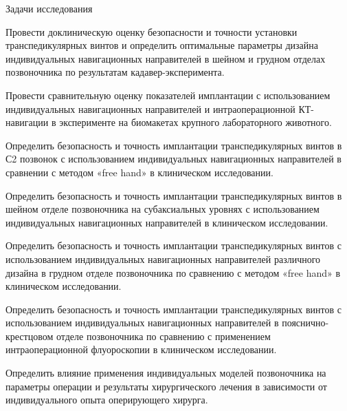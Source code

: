 
Задачи исследования

\item Провести доклиническую оценку безопасности и точности установки
			транспедикулярных винтов и определить оптимальные параметры дизайна
			индивидуальных навигационных направителей в шейном и грудном отделах
			позвоночника по результатам кадавер-эксперимента.

\item Провести   сравнительную    оценку   показателей
			имплантации   с
			использованием индивидуальных навигационных направителей и
			интраоперационной КТ-навигации в эксперименте на биомакетах крупного
			лабораторного
			животного.

\item Определить безопасность и точность имплантации
			транспедикулярных винтов в С2 позвонок с использованием индивидуальных
			навигационных
			направителей в сравнении с методом «free hand» в клиническом
			исследовании.

\item Определить безопасность и точность имплантации
			транспедикулярных винтов в шейном отделе позвоночника на
			субаксиальных уровнях с
			использованием индивидуальных навигационных направителей
			в клиническом
			исследовании.

\item Определить безопасность и точность
			имплантации транспедикулярных винтов с использованием индивидуальных
			навигационных направителей различного дизайна в грудном отделе
			позвоночника по сравнению с
			методом «free hand» в клиническом исследовании.

\item Определить безопасность и точность
			имплантации транспедикулярных винтов с использованием
			индивидуальных навигационных направителей
			в пояснично-крестцовом отделе позвоночника
			по сравнению с применением
			интраоперационной флуороскопии в клиническом
			исследовании.

\item Определить влияние применения
			индивидуальных моделей позвоночника на параметры операции и
			результаты хирургического лечения в
			зависимости от индивидуального опыта
			оперирующего хирурга.

